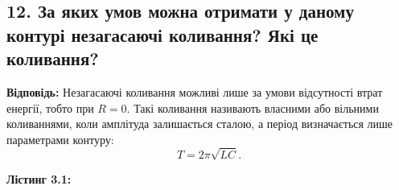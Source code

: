 \documentclass[12pt,a4paper]{article}
\begin{document}
    \subsection*{12. За яких умов можна отримати у даному контурі незагасаючі коливання? Які це коливання?}
    \textbf{Відповідь:}  
    Незагасаючі коливання можливі лише за умови відсутності втрат енергії, тобто при $R=0$.  
    Такі коливання називають власними або вільними коливаннями, коли амплітуда залишається сталою, а період визначається лише параметрами контуру:
    \[
    T = 2\pi\sqrt{LC}.
    \]

    \newpage

    \hypertarget{listing1}{}

    \textbf{\large Лістинг 3.1:}

    \vspace{1em}
\end{document}

